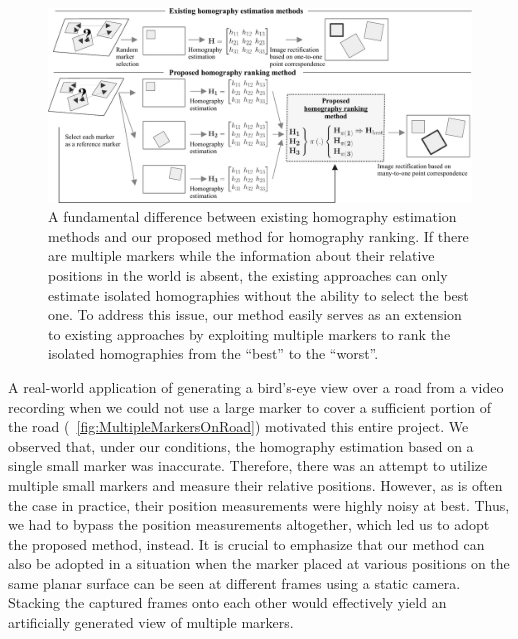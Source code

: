 \begin{figure}[t]
    \centerline{\includegraphics[width=\linewidth]{figures/homography/motivation_diagram.pdf}}
    \caption[Homography ranking motivation diagram]{A fundamental difference between existing homography estimation methods and our proposed method for homography ranking. If there are multiple markers while the information about their relative positions in the world is absent, the existing approaches can only estimate isolated homographies without the ability to select the best one. To address this issue, our method easily serves as an extension to existing approaches by exploiting multiple markers to rank the isolated homographies from the ``best'' to the ``worst''.}
    \label{fig:HomographyMotivationDiagram}
\end{figure}

A real-world application of generating a bird's-eye view over a road from a video recording when we could not use a large marker to cover a sufficient portion of the road (\figtext{}~\ref{fig:MultipleMarkersOnRoad}) motivated this entire project. We observed that, under our conditions, the homography estimation based on a single small marker was inaccurate. Therefore, there was an attempt to utilize multiple small markers and measure their relative positions. However, as is often the case in practice, their position measurements were highly noisy at best. Thus, we had to bypass the position measurements altogether, which led us to adopt the proposed method, instead. It is crucial to emphasize that our method can also be adopted in a situation when the marker placed at various positions on the same planar surface can be seen at different frames using a static camera. Stacking the captured frames onto each other would effectively yield an artificially generated view of multiple markers.

